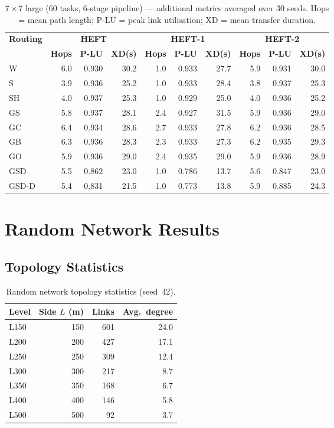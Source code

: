 \documentclass[11pt]{article}
\begin{document}
\begin{table}[H]\centering\small
\begin{tabular}{l r r r r r r r r r}
\toprule
\textbf{Routing} & \multicolumn{3}{c}{\textbf{HEFT}} & \multicolumn{3}{c}{\textbf{HEFT-1}} & \multicolumn{3}{c}{\textbf{HEFT-2}} \\
\cmidrule(lr){2-4}\cmidrule(lr){5-7}\cmidrule(lr){8-10}
& \textbf{Hops} & \textbf{P-LU} & \textbf{XD(s)} & \textbf{Hops} & \textbf{P-LU} & \textbf{XD(s)} & \textbf{Hops} & \textbf{P-LU} & \textbf{XD(s)} \\
\midrule
  W & 6.0 & 0.930 & 30.2 & 1.0 & 0.933 & 27.7 & 5.9 & 0.931 & 30.0 \\
  S & 3.9 & 0.936 & 25.2 & 1.0 & 0.933 & 28.4 & 3.8 & 0.937 & 25.3 \\
  SH & 4.0 & 0.937 & 25.3 & 1.0 & 0.929 & 25.0 & 4.0 & 0.936 & 25.2 \\
  GS & 5.8 & 0.937 & 28.1 & 2.4 & 0.927 & 31.5 & 5.9 & 0.936 & 29.0 \\
  GC & 6.4 & 0.934 & 28.6 & 2.7 & 0.933 & 27.8 & 6.2 & 0.936 & 28.5 \\
  GB & 6.3 & 0.936 & 28.3 & 2.3 & 0.933 & 27.3 & 6.2 & 0.935 & 29.3 \\
  GO & 5.9 & 0.936 & 29.0 & 2.4 & 0.935 & 29.0 & 5.9 & 0.936 & 28.9 \\
  GSD & 5.5 & 0.862 & 23.0 & 1.0 & 0.786 & 13.7 & 5.6 & 0.847 & 23.0 \\
  GSD-D & 5.4 & 0.831 & 21.5 & 1.0 & 0.773 & 13.8 & 5.9 & 0.885 & 24.3 \\
\bottomrule\end{tabular}
\caption{$7\times7$ large (60 tasks, 6-stage pipeline) --- additional metrics averaged over 30 seeds. Hops = mean path length; P-LU = peak link utilisation; XD = mean transfer duration.}
\end{table}

\section{Random Network Results}

\subsection{Topology Statistics}
\begin{table}[H]\centering
\begin{tabular}{l r r r}\toprule
\textbf{Level} & \textbf{Side $L$ (m)} & \textbf{Links} & \textbf{Avg.\ degree} \\\midrule
  L150 & 150 & 601 & 24.0 \\
  L200 & 200 & 427 & 17.1 \\
  L250 & 250 & 309 & 12.4 \\
  L300 & 300 & 217 & 8.7 \\
  L350 & 350 & 168 & 6.7 \\
  L400 & 400 & 146 & 5.8 \\
  L500 & 500 & 92 & 3.7 \\
\bottomrule\end{tabular}
\caption{Random network topology statistics (seed~42).}
\end{table}
\end{document}
